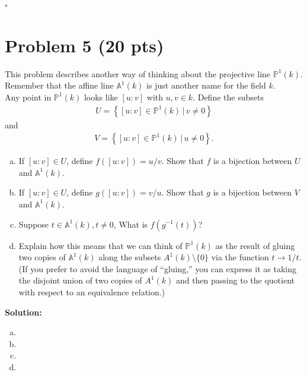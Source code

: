 \documentclass[12pt]{article}
\newcommand{\lc}{\left\{}
\newcommand{\rc}{\right\}}
\begin{document}
\hfill$\square$




\newpage


\section*{Problem 5 \small{(20 pts)}} 


This problem describes another way of thinking about the projective line $\mathbb{P}^1(k)$. Remember that the affine line $\mathbb{A}^1(k)$ is just another name for the field $k$. \\

Any point in $\mathbb{P}^1(k)$ looks like $[u:v]$ with $u,v \in k$. Define the subsets
\begin{align*}
U = \lc [u:v]\in \mathbb{P}^1(k) \,\vert\, v \neq 0  \rc
\end{align*}
and
\begin{align*}
V = \lc [u:v]\in \mathbb{P}^1(k) \,\vert\, u \neq 0  \rc.
\end{align*}
\begin{enumerate}[(a)]
	\item If $[u:v] \in U$, define $f([u:v]) = u/v$. Show that $f$ is a bijection between $U$ and $\mathbb{A}^1(k)$. 
	\item If $[u:v] \in U$, define $g([u:v]) = v/u$. Show that $g$ is a bijection between $V$ and $\mathbb{A}^1(k)$. 
	\item Suppose $t \in \mathbb{A}^1(k), t\neq 0$, What is $f(g^{-1}(t))$?
	\item Explain how this means that we can think of $\mathbb{P}^1(k)$ as the result of gluing two copies of $\mathbb{A}^1(k)$ along the subsets $A^1(k)\setminus \{0\}$ via the function $t \to 1/t$. (If you prefer to avoid the language of ``gluing,'' you can express it as taking the disjoint union of two copies of $A^1(k)$ and then passing to the quotient with respect to an equivalence relation.) 
\end{enumerate}



\noindent \textbf{Solution:} 


\begin{enumerate}[(a)]
	\item 
	\item 
	\item 
	\item 
\end{enumerate}
\end{document}

